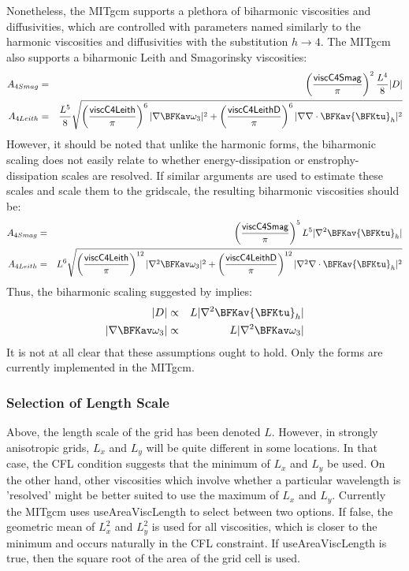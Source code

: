 Nonetheless, the MITgcm supports a plethora of biharmonic viscosities
and diffusivities, which are controlled with parameters named
similarly to the harmonic viscosities and diffusivities with the
substitution $h\rightarrow 4$.  The MITgcm also supports a biharmonic
Leith and Smagorinsky viscosities:
\begin{eqnarray}
A_{4Smag} & = & 
\left(\frac{{\sf viscC4Smag}}{\pi}\right)^2\frac{L^4}{8}|D| \\
A_{4Leith} & = & 
\frac{L^5}{8}\sqrt{\left(\frac{{\sf viscC4Leith}}{\pi}\right)^6
  |\nabla \BFKav \omega_3|^2
  +\left(\frac{{\sf viscC4LeithD}}{\pi}\right)^6
  |\nabla \nabla\cdot \BFKav {\bf \BFKtu}_h|^2}
\end{eqnarray}
However, it should be noted that unlike the harmonic forms, the
biharmonic scaling does not easily relate to whether
energy-dissipation or enstrophy-dissipation scales are resolved.  If
similar arguments are used to estimate these scales and scale them to
the gridscale, the resulting biharmonic viscosities should be:
\begin{eqnarray}
A_{4Smag} & = & 
\left(\frac{{\sf viscC4Smag}}{\pi}\right)^5L^5
|\nabla^2\BFKav {\bf \BFKtu}_h| \\
A_{4Leith} & = & 
L^6\sqrt{\left(\frac{{\sf viscC4Leith}}{\pi}\right)^{12}
  |\nabla^2 \BFKav \omega_3|^2
  +\left(\frac{{\sf viscC4LeithD}}{\pi}\right)^{12}
  |\nabla^2 \nabla\cdot \BFKav {\bf \BFKtu}_h|^2}
\end{eqnarray}
Thus, the biharmonic scaling suggested by \cite{grha00} implies:
\begin{eqnarray}
|D| & \propto &  L|\nabla^2\BFKav {\bf \BFKtu}_h|\\
|\nabla \BFKav \omega_3| & \propto & L|\nabla^2 \BFKav \omega_3|
\end{eqnarray}
It is not at all clear that these assumptions ought to hold.  Only the
\cite{grha00} forms are currently implemented in the MITgcm.

\subsubsection{Selection of Length Scale}
Above, the length scale of the grid has been denoted $L$.  However, in
strongly anisotropic grids, $L_x$ and $L_y$ will be quite different in
some locations.  In that case, the CFL condition suggests that the
minimum of $L_x$ and $L_y$ be used.  On the other hand, other
viscosities which involve whether a particular wavelength is
'resolved' might be better suited to use the maximum of $L_x$ and
$L_y$.  Currently the MITgcm uses {\sf useAreaViscLength} to select
between two options.  If false, the geometric mean of $L^2_x$ and
$L^2_y$ is used for all viscosities, which is closer to the minimum
and occurs naturally in the CFL constraint.  If {\sf
  useAreaViscLength} is true, then the square root of the area of the
grid cell is used.

